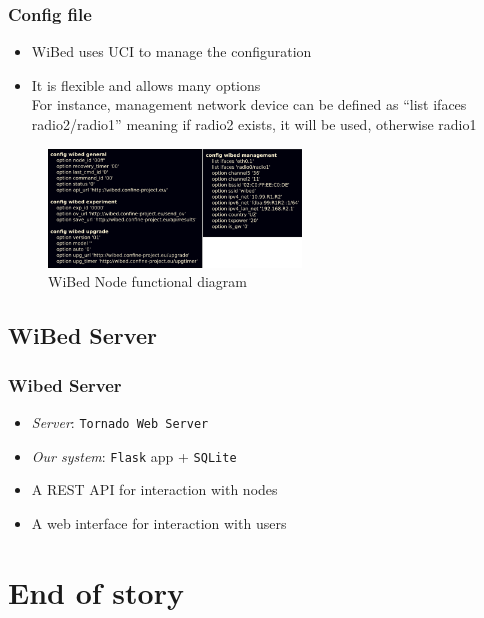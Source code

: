 \documentclass[usepdftitle=false,13pt]{beamer}
\begin{document}
\begin{frame}\frametitle{Config file}

	\begin{itemize}
	\item WiBed uses UCI to manage the configuration
	\item It is flexible and allows many options
	\\
	For instance, management network device can be defined as ``list ifaces radio2/radio1'' meaning if radio2 exists, it will be used, otherwise radio1
	\end{itemize}

	\begin{figure}[h!]
	\begin{center}
	\includegraphics[width=0.6\textwidth]{pic/config}
	  \caption{WiBed Node functional diagram}
	\label{fig:funct}
	\end{center}
	\end{figure}
\end{frame}



\subsection{WiBed Server}



\begin{frame}\frametitle{Wibed Server}
	\begin{itemize}
		\item \textit{Server}:  \texttt{Tornado Web Server}
		\item \textit{Our system}: \texttt{Flask} app + \texttt{SQLite}
		\item A REST API for interaction with nodes
		\item A web interface for interaction with users
	\end{itemize}

\end{frame}

\section{End of story}
\end{document}

